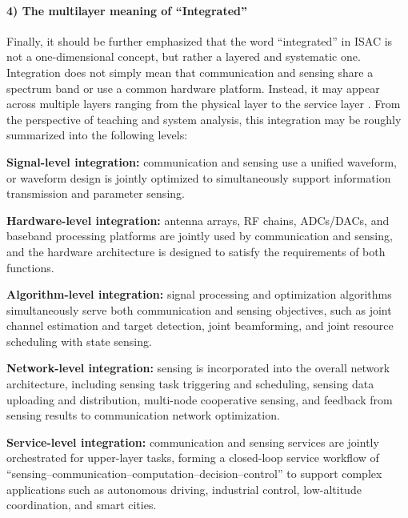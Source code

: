 \paragraph{4) The multilayer meaning of ``Integrated''}

Finally, it should be further emphasized that the word ``integrated'' in ISAC is not a one-dimensional concept, but rather a layered and systematic one. Integration does not simply mean that communication and sensing share a spectrum band or use a common hardware platform. Instead, it may appear across multiple layers ranging from the physical layer to the service layer \cite{Liu2022ISAC,Zhang2021ISAC6G,Liu2020JointRadarComm}. From the perspective of teaching and system analysis, this integration may be roughly summarized into the following levels:

\begin{itemize}
    \item \textbf{Signal-level integration:} communication and sensing use a unified waveform, or waveform design is jointly optimized to simultaneously support information transmission and parameter sensing.

    \item \textbf{Hardware-level integration:} antenna arrays, RF chains, ADCs/DACs, and baseband processing platforms are jointly used by communication and sensing, and the hardware architecture is designed to satisfy the requirements of both functions.

    \item \textbf{Algorithm-level integration:} signal processing and optimization algorithms simultaneously serve both communication and sensing objectives, such as joint channel estimation and target detection, joint beamforming, and joint resource scheduling with state sensing.

    \item \textbf{Network-level integration:} sensing is incorporated into the overall network architecture, including sensing task triggering and scheduling, sensing data uploading and distribution, multi-node cooperative sensing, and feedback from sensing results to communication network optimization.
    
    \begin{sloppypar}
    \item \textbf{Service-level integration:} communication and sensing services are jointly orchestrated for upper-layer tasks, forming a closed-loop service workflow of ``sensing--communication--computation--decision--control'' to support complex applications such as autonomous driving, industrial control, low-altitude coordination, and smart cities.
    \end{sloppypar}
\end{itemize}

